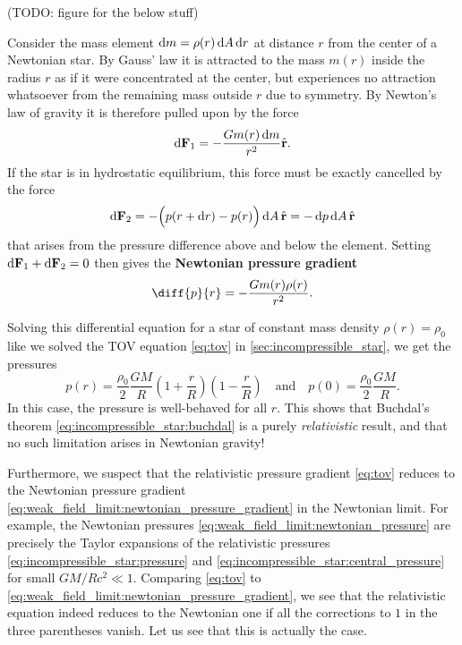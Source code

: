 (TODO: figure for the below stuff)

Consider the mass element $\mathop{}\!\mathrm{d} m = \rho(r) \mathop{}\!\mathrm{d} A \mathop{}\!\mathrm{d} r$ at distance $r$ from the center of a Newtonian star.
By Gauss' law it is attracted to the mass $m(r)$ inside the radius $r$ as if it were concentrated at the center, but experiences no attraction whatsoever from the remaining mass outside $r$ due to symmetry.
By Newton's law of gravity it is therefore pulled upon by the force
\begin{equation}
	\mathop{}\!\mathrm{d} \mathbf{F}_1 = -\frac{G m(r) \mathop{}\!\mathrm{d} m}{r^2} \hat{\textbf{r}} .
	\label{eq:weak_field_limit:force_newton}
\end{equation}
If the star is in hydrostatic equilibrium, this force must be exactly cancelled by the force
\begin{equation}
	\mathop{}\!\mathrm{d} \textbf{F}_2 = - \Big( p(r + \mathop{}\!\mathrm{d} r) - p(r) \Big) \mathop{}\!\mathrm{d} A \, \hat{\textbf{r}} = -\mathop{}\!\mathrm{d} p \mathop{}\!\mathrm{d} A \, \hat{\textbf{r}}
	\label{eq:weak_field_limit:force_pressure}
\end{equation}
that arises from the pressure difference above and below the element.
Setting $\mathop{}\!\mathrm{d} \textbf{F}_1 + \mathop{}\!\mathrm{d} \textbf{F}_2 = 0$ then gives the \textbf{Newtonian pressure gradient}
\begin{equation}
	\diff{p}{r} = -\frac{G m(r) \rho(r)}{r^2} .
	\label{eq:weak_field_limit:newtonian_pressure_gradient}
\end{equation}

Solving this differential equation for a star of constant mass density $\rho(r) = \rho_0$ like we solved the TOV equation \eqref{eq:tov} in \cref{sec:incompressible_star}, we get the pressures
\begin{equation}
	p(r) = \frac{\rho_0}{2} \frac{G M}{R} \left( 1 + \frac{r}{R} \right) \left( 1 - \frac{r}{R} \right)
	\quad \text{and} \quad
	p(0) = \frac{\rho_0}{2} \frac{GM}{R} .
	\label{eq:weak_field_limit:newtonian_pressure}
\end{equation}
In this case, the pressure is well-behaved for all $r$.
This shows that Buchdal's theorem \eqref{eq:incompressible_star:buchdal} is a purely \emph{relativistic} result, and that no such limitation arises in Newtonian gravity!


Furthermore, we suspect that the relativistic pressure gradient \eqref{eq:tov} reduces to the Newtonian pressure gradient \eqref{eq:weak_field_limit:newtonian_pressure_gradient} in the Newtonian limit.
For example, the Newtonian pressures \eqref{eq:weak_field_limit:newtonian_pressure} are precisely the Taylor expansions of the relativistic pressures \eqref{eq:incompressible_star:pressure} and \eqref{eq:incompressible_star:central_pressure} for small $GM/Rc^2 \ll 1$.
Comparing \cref{eq:tov} to \cref{eq:weak_field_limit:newtonian_pressure_gradient}, we see that the relativistic equation indeed reduces to the Newtonian one if all the corrections to $1$ in the three parentheses vanish.
Let us see that this is actually the case.

